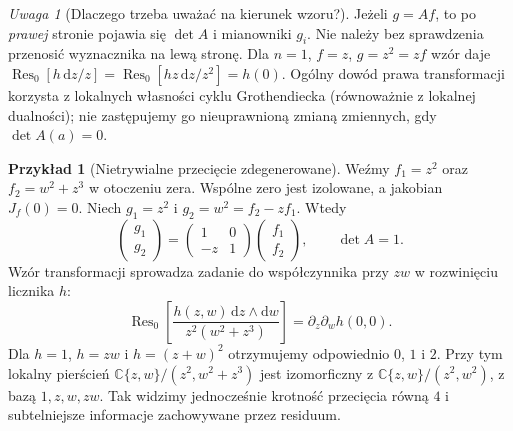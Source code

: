\documentclass[11pt,a4paper,openany]{report}
\numberwithin{equation}{section}
\theoremstyle{plain}
\theoremstyle{definition}
\newtheorem{przyklad}[twierdzenie]{Przykład}
\theoremstyle{remark}
\newtheorem{uwaga}[twierdzenie]{Uwaga}
\newcommand{\C}{\mathbb C}
\begin{document}
\begin{uwaga}[Dlaczego trzeba uważać na kierunek wzoru?]
Jeżeli $g=Af$, to po \emph{prawej} stronie pojawia się
$\det A$ i mianowniki $g_i$. Nie należy bez sprawdzenia
przenosić wyznacznika na lewą stronę.
Dla $n=1$, $f=z$, $g=z^2=zf$ wzór daje
$\operatorname{Res}_0[h\,\mathrm dz/z]
=\operatorname{Res}_0[hz\,\mathrm dz/z^2]=h(0)$.
Ogólny dowód prawa transformacji korzysta z lokalnych
własności cyklu Grothendiecka (równoważnie z lokalnej
dualności); nie zastępujemy go nieuprawnioną zmianą
zmiennych, gdy $\det A(a)=0$.
\end{uwaga}

\begin{przyklad}[Nietrywialne przecięcie zdegenerowane]
\label{prz:ga4-res-degenerate}
Weźmy $f_1=z^2$ oraz $f_2=w^2+z^3$ w otoczeniu zera.
Wspólne zero jest izolowane, a jakobian $J_f(0)=0$.
Niech $g_1=z^2$ i $g_2=w^2=f_2-zf_1$. Wtedy
\[
\begin{pmatrix}g_1\\g_2\end{pmatrix}
=\begin{pmatrix}1&0\\-z&1\end{pmatrix}
\begin{pmatrix}f_1\\f_2\end{pmatrix},\qquad \det A=1.
\]
Wzór transformacji sprowadza zadanie do współczynnika
przy $zw$ w rozwinięciu licznika $h$:
\[
\operatorname{Res}_0\!\left[
\frac{h(z,w)\,\mathrm dz\wedge\mathrm dw}
{z^2(w^2+z^3)}\right]
=\partial_z\partial_w h(0,0).
\]
Dla $h=1$, $h=zw$ i $h=(z+w)^2$ otrzymujemy
odpowiednio $0$, $1$ i $2$.
Przy tym lokalny pierścień
$\C\{z,w\}/(z^2,w^2+z^3)$ jest izomorficzny z
$\C\{z,w\}/(z^2,w^2)$, z bazą $1,z,w,zw$.
Tak widzimy jednocześnie krotność przecięcia równą $4$
i subtelniejsze informacje zachowywane przez residuum.
\end{przyklad}
\end{document}
